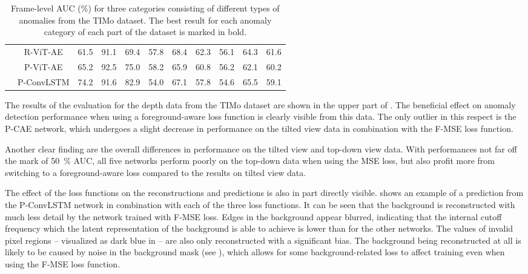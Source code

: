 \documentclass[10pt,twocolumn,letterpaper]{article}
\begin{document}
\begin{table*}[tb]
\begin{tabular}{c c|c|c|c||c|c|c||c|c|c|}
		\multicolumn{1}{|c}{}                                                                  & \multicolumn{1}{|c|}{R-ViT-AE}   & 61.5  & 91.1          & 69.4          & 57.8 & 68.4          & 62.3          & 56.1 & 64.3          & 61.6                  \\
		\multicolumn{1}{|c}{}                                                                  & \multicolumn{1}{|c|}{P-ViT-AE}   & 65.2  & 92.5          & 75.0          & 58.2 & 65.9          & 60.8          & 56.2 & 62.1          & 60.2                  \\
		\multicolumn{1}{|c}{}                                                                  & \multicolumn{1}{|c|}{P-ConvLSTM} & 74.2  & 91.6          & 82.9          & 54.0 & 67.1          & 57.8          & 54.6 & 65.5          & 59.1                  \\ \hline
	\end{tabular}
	\caption{Frame-level AUC (\%) for three categories consisting of different types of anomalies from the TIMo dataset. The best result for each anomaly category of each part of the dataset is marked in bold.}
	\label{tab:anomaly_group_results}
\end{table*}
The results of the evaluation for the depth data from the TIMo dataset are shown in the upper part of . The beneficial effect on anomaly detection performance when using a foreground-aware loss function is clearly visible from this data. The only outlier in this respect is the P-CAE network, which undergoes a slight decrease in performance on the tilted view data in combination with the F-MSE loss function.

Another clear finding are the overall differences in performance on the tilted view and top-down view data. With performances not far off the mark of \SI{50}{\percent} AUC, all five networks perform poorly on the top-down data when using the MSE loss, but also profit more from switching to a foreground-aware loss compared to the results on tilted view data.

The effect of the loss functions on the reconstructions and predictions is also in part directly visible.  shows an example of a prediction from the P-ConvLSTM network in combination with each of the three loss functions. It can be seen that the background is reconstructed with much less detail by the network trained with F-MSE loss. Edges in the background appear blurred, indicating that the internal cutoff frequency which the latent representation of the background is able to achieve is lower than for the other networks. The values of invalid pixel regions -- visualized as dark blue in  -- are also only reconstructed with a significant bias. The background being reconstructed at all is likely to be caused by noise in the background mask (see ), which allows for some background-related loss to affect training even when using the F-MSE loss function.
\end{document}
